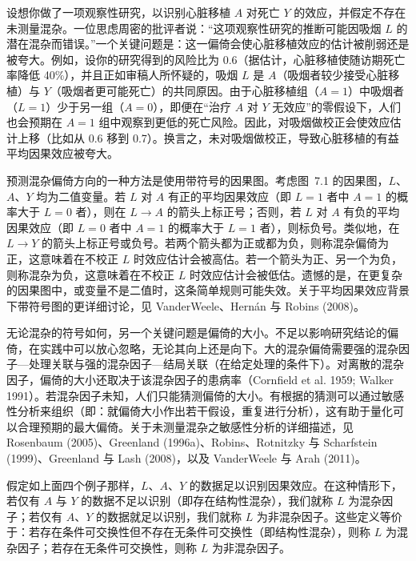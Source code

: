 \renewcommand{\FPname}{精要（Fine Point）}
\begin{finepoint}[混杂偏倚的强度与方向]
设想你做了一项观察性研究，以识别心脏移植 $A$ 对死亡 $Y$ 的效应，并假定不存在未测量混杂。一位思虑周密的批评者说：“这项观察性研究的推断可能因吸烟 $L$ 的潜在混杂而错误。”一个关键问题是：这一偏倚会使心脏移植效应的估计被削弱还是被夸大。例如，设你的研究得到的风险比为 0.6（据估计，心脏移植使随访期死亡率降低 40\%），并且正如审稿人所怀疑的，吸烟 $L$ 是 $A$（吸烟者较少接受心脏移植）与 $Y$（吸烟者更可能死亡）的共同原因。由于心脏移植组（$A=1$）中吸烟者（$L=1$）少于另一组（$A=0$），即便在“治疗 $A$ 对 $Y$ 无效应”的零假设下，人们也会预期在 $A=1$ 组中观察到更低的死亡风险。因此，对吸烟做校正会使效应估计上移（比如从 0.6 移到 0.7）。换言之，未对吸烟做校正，导致心脏移植的有益平均因果效应被夸大。

预测混杂偏倚方向的一种方法是使用带符号的因果图。考虑图~7.1 的因果图，$L$、$A$、$Y$ 均为二值变量。若 $L$ 对 $A$ 有正的平均因果效应（即 $L=1$ 者中 $A=1$ 的概率大于 $L=0$ 者），则在 $L\to A$ 的箭头上标正号；否则，若 $L$ 对 $A$ 有负的平均因果效应（即 $L=0$ 者中 $A=1$ 的概率大于 $L=1$ 者），则标负号。类似地，在 $L\to Y$ 的箭头上标正号或负号。若两个箭头都为正或都为负，则称混杂偏倚为正，这意味着在不校正 $L$ 时效应估计会被高估。若一个箭头为正、另一个为负，则称混杂为负，这意味着在不校正 $L$ 时效应估计会被低估。遗憾的是，在更复杂的因果图中，或变量不是二值时，这条简单规则可能失效。关于平均因果效应背景下带符号图的更详细讨论，见 VanderWeele、Hern\'an 与 Robins (2008)。

无论混杂的符号如何，另一个关键问题是偏倚的大小。不足以影响研究结论的偏倚，在实践中可以放心忽略，无论其向上还是向下。大的混杂偏倚需要强的混杂因子—处理关联与强的混杂因子—结局关联（在给定处理的条件下）。对离散的混杂因子，偏倚的大小还取决于该混杂因子的患病率（Cornfield et al. 1959; Walker 1991）。若混杂因子未知，人们只能猜测偏倚的大小。有根据的猜测可以通过敏感性分析来组织（即：就偏倚大小作出若干假设，重复进行分析），这有助于量化可以合理预期的最大偏倚。关于未测量混杂之敏感性分析的详细描述，见 Rosenbaum (2005)、Greenland (1996a)、Robins、Rotnitzky 与 Scharfstein (1999)、Greenland 与 Lash (2008)，以及 VanderWeele 与 Arah (2011)。
\end{finepoint}
\renewcommand{\FPname}{精要}

假定如上面四个例子那样，$L$、$A$、$Y$ 的数据足以识别因果效应。在这种情形下，若仅有 $A$ 与 $Y$ 的数据不足以识别（即存在结构性混杂），我们就称 $L$ 为混杂因子；若仅有 $A$、$Y$ 的数据就足以识别，我们就称 $L$ 为非混杂因子。这些定义等价于：若存在条件可交换性但不存在无条件可交换性（即结构性混杂），则称 $L$ 为混杂因子；若存在无条件可交换性，则称 $L$ 为非混杂因子。

